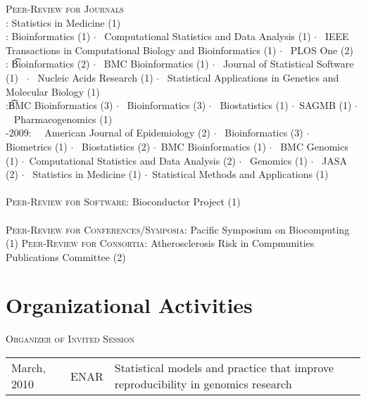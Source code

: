 \documentclass[11pt]{article}%
\newcommand{\largedot}{{\large $\cdot$}}
\begin{document}
{\textsc{Peer-Review for Journals}\\
: Statistics in Medicine (1)\\
: Bioinformatics (1) \largedot~ Computational Statistics and Data
Analysis (1) \largedot~ IEEE Transactions in Computational Biology and
Bioinformatics (1) \largedot~ PLOS One (2)\\
: \t Bioinformatics (2) \largedot~ BMC Bioinformatics (1)
\largedot~ Journal of Statistical Software (1) ~\largedot~ Nucleic
Acids Research (1) \largedot~ Statistical Applications in Genetics and Molecular
Biology (1) \\
:\t BMC Bioinformatics (3) \largedot~ Bioinformatics (3)
\largedot~ Biostatistics (1) \largedot ~SAGMB (1) \largedot ~
Pharmacogenomics (1)\\
-2009:~~ American Journal of Epidemiology (2) \largedot ~
Bioinformatics (3) \largedot ~ Biometrics (1) \largedot~ Biostatistics
(2) \largedot ~BMC Bioinformatics (1) \largedot~ BMC Genomics (1)
\largedot ~Computational Statistics and Data Analysis (2) \largedot~
Genomics (1) \largedot~ JASA (2) \largedot~ Statistics in Medicine (1)
\largedot~Statistical Methods and Applications (1)\\
\vspace{0.05em}\\
\noindent \textsc{Peer-Review for Software:} Bioconductor Project (1)\\
\vspace{0.05em}\\
\noindent\textsc{Peer-Review for Conferences/Symposia:} Pacific
Symposium on Biocomputing (1)
\vspace{0.05em}
\noindent\textsc{Peer-Review for Consortia:} Atherosclerosis Risk in
Compmunities Publications Committee (2)

\section*{\sc Organizational Activities}

\noindent\textsc{Organizer of Invited Session}\\
\begin{tabular}{lll}
  March, 2010 & ENAR & Statistical models and practice that improve reproducibility in genomics research\\
\end{tabular}

\vspace{2pt}

}
\end{document}
